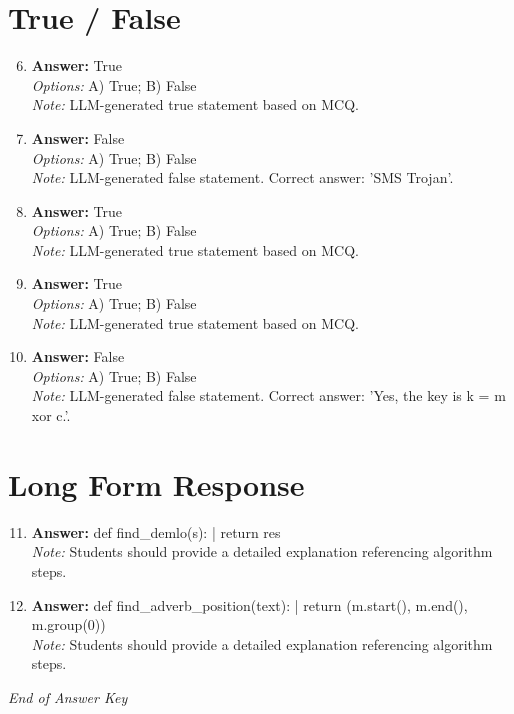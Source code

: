\documentclass[12pt]{article}
\begin{document}
\section*{True / False}
\begin{enumerate}[label=\arabic*.]
\setcounter{enumi}{5}
\item \textbf{Answer:} True
\\ \textit{Options:} A) True; B) False
\\ \textit{Note:} LLM-generated true statement based on MCQ.
\item \textbf{Answer:} False
\\ \textit{Options:} A) True; B) False
\\ \textit{Note:} LLM-generated false statement. Correct answer: 'SMS Trojan'.
\item \textbf{Answer:} True
\\ \textit{Options:} A) True; B) False
\\ \textit{Note:} LLM-generated true statement based on MCQ.
\item \textbf{Answer:} True
\\ \textit{Options:} A) True; B) False
\\ \textit{Note:} LLM-generated true statement based on MCQ.
\item \textbf{Answer:} False
\\ \textit{Options:} A) True; B) False
\\ \textit{Note:} LLM-generated false statement. Correct answer: 'Yes, the key is k = m xor c.'.
\end{enumerate}

\section*{Long Form Response}
\begin{enumerate}[label=\arabic*.]
\setcounter{enumi}{10}
\item \textbf{Answer:} def find\_demlo(s): | return res
\\ \textit{Note:} Students should provide a detailed explanation referencing algorithm steps.
\item \textbf{Answer:} def find\_adverb\_position(text): | return (m.start(), m.end(), m.group(0))
\\ \textit{Note:} Students should provide a detailed explanation referencing algorithm steps.
\end{enumerate}

\vfill
\noindent\textit{End of Answer Key}
\end{document}
